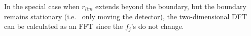 \documentclass[10pt,twoside, b5paper,pdftex]{report}
\begin{document}

In the special case when $r_{lim}$ extends beyond the boundary, but the boundary remains stationary (i.e.~ only moving the detector), the two-dimensional DFT can be calculated as an FFT since the $f_{j}$'s do not change. 



\end{document}
